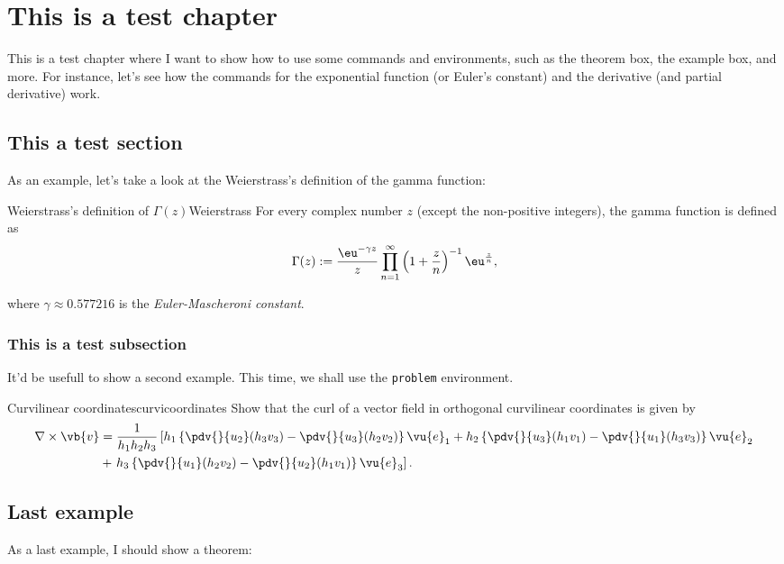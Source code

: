 \chapter{This is a test chapter}
This is a test chapter where I want to show how to use some commands and environments, such as the theorem box, the example box, and more. For instance, let's see how the commands for the exponential function (or Euler's constant) and the derivative (and partial derivative) work. 

\section{This a test section}
As an example, let's take a look at the Weierstrass's definition of the gamma function:

\begin{definicion}{Weierstrass's definition of $\Gamma(z)$}{Weierstrass}
For every complex number $z$ (except the non-positive integers), the gamma function is defined as
\[
\Gamma(z) := \dfrac{\eu^{-\gamma z}}{z} \prod_{n = 1}^{\infty}\left(1 + \dfrac{z}{n}\right)^{-1} \eu^{\frac{z}{n}},
\]

where $\gamma \approx 0.577216$ is the \textit{Euler-Mascheroni constant}.
\end{definicion}

\subsection{This is a test subsection}
It'd be usefull to show a second example. This time, we shall use the \texttt{problem} environment.

\begin{problema}{Curvilinear coordinates}{curvicoordinates}
Show that the curl of a vector field in orthogonal curvilinear coordinates is given by
\begin{align*}
    \nabla \times \vb{v}
    &= \dfrac{1}{h_{1}h_{2}h_{3}}\left[h_{1} \left\lbrace {\pdv{}{u_{2}}} (h_{3}v_{3}) - {\pdv{}{u_{3}}} (h_{2}v_{2})\right\rbrace \vu{e}_{1} + h_{2}\left\lbrace {\pdv{}{u_{3}}} (h_{1}v_{1}) - {\pdv{}{u_{1}}} (h_{3}v_{3}) \right\rbrace \vu{e}_{2}\right.\\
    &+ \left. h_{3} \left\lbrace {\pdv{}{u_{1}}} (h_{2}v_{2}) - {\pdv{}{u_{2}}} (h_{1}v_{1}) \right\rbrace \vu{e}_{3}\right].
\end{align*}
\end{problema}

\section{Last example}
As a last example, I should show a theorem:

